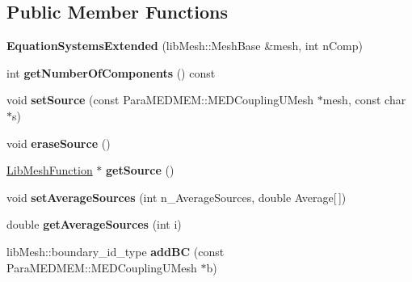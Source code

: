 \subsection*{Public Member Functions}
\begin{DoxyCompactItemize}
\item 
\hypertarget{class_equation_systems_extended_ac39a09a8c31cfdf406c512f97c8a621c}{{\bfseries Equation\-Systems\-Extended} (lib\-Mesh\-::\-Mesh\-Base \&mesh, int n\-Comp)}\label{class_equation_systems_extended_ac39a09a8c31cfdf406c512f97c8a621c}

\item 
\hypertarget{class_equation_systems_extended_a69834fd341bff79b73645507ba1b359c}{int {\bfseries get\-Number\-Of\-Components} () const }\label{class_equation_systems_extended_a69834fd341bff79b73645507ba1b359c}

\item 
\hypertarget{class_equation_systems_extended_a2a42b1a2930e2685a479922c1c6cb8a9}{void {\bfseries set\-Source} (const Para\-M\-E\-D\-M\-E\-M\-::\-M\-E\-D\-Coupling\-U\-Mesh $\ast$mesh, const char $\ast$s)}\label{class_equation_systems_extended_a2a42b1a2930e2685a479922c1c6cb8a9}

\item 
\hypertarget{class_equation_systems_extended_aeafd6d4c8fce5f31a26938a2c8660b70}{void {\bfseries erase\-Source} ()}\label{class_equation_systems_extended_aeafd6d4c8fce5f31a26938a2c8660b70}

\item 
\hypertarget{class_equation_systems_extended_a6fa1edb48c5ed6411d3e74b169445750}{\hyperlink{class_lib_mesh_function}{Lib\-Mesh\-Function} $\ast$ {\bfseries get\-Source} ()}\label{class_equation_systems_extended_a6fa1edb48c5ed6411d3e74b169445750}

\item 
\hypertarget{class_equation_systems_extended_aa5f0d1b7886f975cb3400c4185fcb5f3}{void {\bfseries set\-Average\-Sources} (int n\-\_\-\-Average\-Sources, double Average\mbox{[}$\,$\mbox{]})}\label{class_equation_systems_extended_aa5f0d1b7886f975cb3400c4185fcb5f3}

\item 
\hypertarget{class_equation_systems_extended_a92ae01b1dace5f3944e1a1d974dcbec2}{double {\bfseries get\-Average\-Sources} (int i)}\label{class_equation_systems_extended_a92ae01b1dace5f3944e1a1d974dcbec2}

\item 
\hypertarget{class_equation_systems_extended_a166f5f20a2e8f446cb21a2ddfc19ead3}{lib\-Mesh\-::boundary\-\_\-id\-\_\-type {\bfseries add\-B\-C} (const Para\-M\-E\-D\-M\-E\-M\-::\-M\-E\-D\-Coupling\-U\-Mesh $\ast$b)}\label{class_equation_systems_extended_a166f5f20a2e8f446cb21a2ddfc19ead3}


\end{DoxyCompactItemize}

